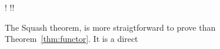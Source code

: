 \begin{theorem}\label{thm:squash}
	\begin{mathpar}
		{
			!\F {} !!\F
		}
	\end{mathpar}
\end{theorem}
The Squash theorem, is more straigtforward to prove than Theorem~\ref{thm:functor}.
It is a direct 


%



